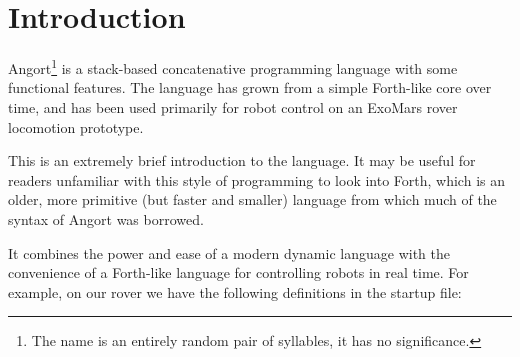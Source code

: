 \lstset{style=ang}
\section{Introduction}
Angort\footnote{The name is an entirely random pair of syllables,
it has no significance.}
is a stack-based concatenative programming language with some
functional features. The language has grown from a simple Forth-like
core over time, and has been used primarily for robot control on
an ExoMars rover locomotion prototype.

This is an extremely brief introduction to the language. It may
be useful for readers unfamiliar with this style of programming
to look into Forth, which is an older, more primitive (but faster and
smaller) language from which much of the syntax of Angort was
borrowed.

It combines the power and ease of a modern dynamic language with
the convenience of a Forth-like language for controlling robots in
real time. For example, on our rover we have the following definitions
in the startup file:

